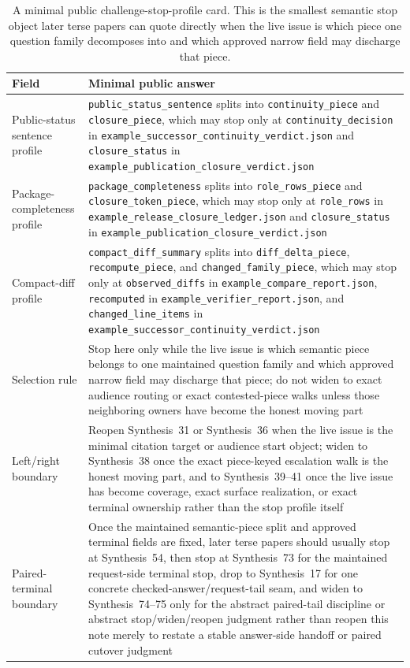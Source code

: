 \documentclass[11pt]{article}
\begin{document}
\begin{table}[t]
\centering
\small
\begin{tabularx}{\linewidth}{@{}lX@{}}
\toprule
Field & Minimal public answer \\
\midrule
Public-status sentence profile & \nolinkurl{public_status_sentence} splits into \nolinkurl{continuity_piece} and \nolinkurl{closure_piece}, which may stop only at \nolinkurl{continuity_decision} in \nolinkurl{example_successor_continuity_verdict.json} and \nolinkurl{closure_status} in \nolinkurl{example_publication_closure_verdict.json} \\
Package-completeness profile & \nolinkurl{package_completeness} splits into \nolinkurl{role_rows_piece} and \nolinkurl{closure_token_piece}, which may stop only at \nolinkurl{role_rows} in \nolinkurl{example_release_closure_ledger.json} and \nolinkurl{closure_status} in \nolinkurl{example_publication_closure_verdict.json} \\
Compact-diff profile & \nolinkurl{compact_diff_summary} splits into \nolinkurl{diff_delta_piece}, \nolinkurl{recompute_piece}, and \nolinkurl{changed_family_piece}, which may stop only at \nolinkurl{observed_diffs} in \nolinkurl{example_compare_report.json}, \nolinkurl{recomputed} in \nolinkurl{example_verifier_report.json}, and \nolinkurl{changed_line_items} in \nolinkurl{example_successor_continuity_verdict.json} \\
Selection rule & Stop here only while the live issue is which semantic piece belongs to one maintained question family and which approved narrow field may discharge that piece; do not widen to exact audience routing or exact contested-piece walks unless those neighboring owners have become the honest moving part \\
Left/right boundary & Reopen Synthesis~31 or Synthesis~36 when the live issue is the minimal citation target or audience start object; widen to Synthesis~38 once the exact piece-keyed escalation walk is the honest moving part, and to Synthesis~39--41 once the live issue has become coverage, exact surface realization, or exact terminal ownership rather than the stop profile itself \\
Paired-terminal boundary & Once the maintained semantic-piece split and approved terminal fields are fixed, later terse papers should usually stop at Synthesis~54, then stop at Synthesis~73 for the maintained request-side terminal stop, drop to Synthesis~17 for one concrete checked-answer/request-tail seam, and widen to Synthesis~74--75 only for the abstract paired-tail discipline or abstract stop/widen/reopen judgment rather than reopen this note merely to restate a stable answer-side handoff or paired cutover judgment \\
\bottomrule
\end{tabularx}
\caption{A minimal public challenge-stop-profile card. This is the smallest semantic stop object later terse papers can quote directly when the live issue is which piece one question family decomposes into and which approved narrow field may discharge that piece.}
\label{tab:minimal-public-challenge-stop-profile-card}
\end{table}
\end{document}
